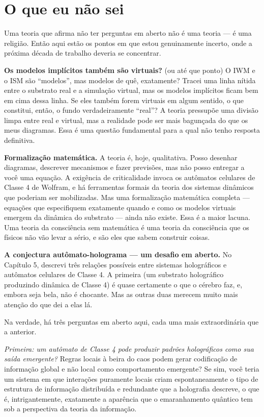 \documentclass[11pt, twoside, openright]{book}
\begin{document}
\section*{O que eu não sei}

Uma teoria que afirma não ter perguntas em aberto não é uma teoria --- é uma religião. Então aqui estão os pontos em que estou genuinamente incerto, onde a próxima década de trabalho deveria se concentrar.

\textbf{Os modelos implícitos também são virtuais?} (ou até que ponto) O IWM e o ISM são ``modelos'', mas modelos de quê, exatamente? Tracei uma linha nítida entre o substrato real e a simulação virtual, mas os modelos implícitos ficam bem em cima dessa linha. Se eles também forem virtuais em algum sentido, o que constitui, então, o fundo verdadeiramente ``real''? A teoria pressupõe uma divisão limpa entre real e virtual, mas a realidade pode ser mais bagunçada do que os meus diagramas. Essa é uma questão fundamental para a qual não tenho resposta definitiva.

\textbf{Formalização matemática.} A teoria é, hoje, qualitativa. Posso desenhar diagramas, descrever mecanismos e fazer previsões, mas não posso entregar a você uma equação. A exigência de criticalidade invoca os autômatos celulares de Classe 4 de Wolfram, e há ferramentas formais da teoria dos sistemas dinâmicos que poderiam ser mobilizadas. Mas uma formalização matemática completa --- equações que especifiquem exatamente quando e como os modelos virtuais emergem da dinâmica do substrato --- ainda não existe. Essa é a maior lacuna. Uma teoria da consciência sem matemática é uma teoria da consciência que os físicos não vão levar a sério, e são eles que sabem construir coisas.

\textbf{A conjectura autômato-holograma --- um desafio em aberto.} No Capítulo 5, descrevi três relações possíveis entre sistemas holográficos e autômatos celulares de Classe 4. A primeira (um substrato holográfico produzindo dinâmica de Classe 4) é quase certamente o que o cérebro faz, e, embora seja bela, não é chocante. Mas as outras duas merecem muito mais atenção do que dei a elas lá.

Na verdade, há três perguntas em aberto aqui, cada uma mais extraordinária que a anterior.

\textit{Primeira: um autômato de Classe 4 pode produzir padrões holográficos como sua saída emergente?} Regras locais à beira do caos podem gerar codificação de informação global e não local como comportamento emergente? Se sim, você teria um sistema em que interações puramente locais criam espontaneamente o tipo de estrutura de informação distribuída e redundante que a holografia descreve, o que é, intrigantemente, exatamente a aparência que o emaranhamento quântico tem sob a perspectiva da teoria da informação.
\end{document}
